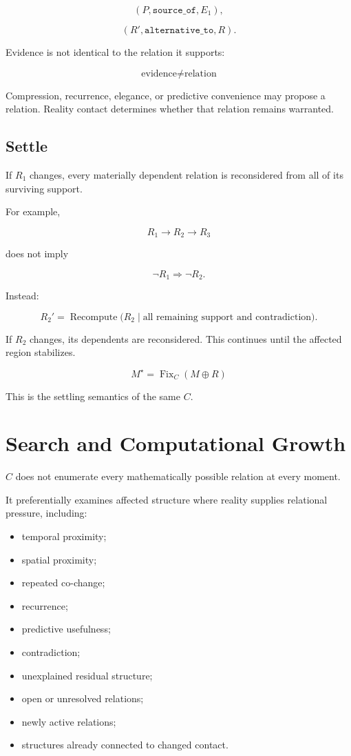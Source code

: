 \documentclass[11pt]{article}
\begin{document}
\[
(P,\texttt{source\_of},E_1),
\]

\[
(R',\texttt{alternative\_to},R).
\]

Evidence is not identical to the relation it supports:

\[
\boxed{\text{evidence}\neq\text{relation}}
\]

Compression, recurrence, elegance, or predictive convenience may propose a relation.
Reality contact determines whether that relation remains warranted.

\subsection{Settle}

If $R_1$ changes, every materially dependent relation is reconsidered from all of its surviving support.

For example,

\[
R_1\rightarrow R_2\rightarrow R_3
\]

does not imply

\[
\neg R_1\Rightarrow \neg R_2.
\]

Instead:

\[
R_2'=
\operatorname{Recompute}
\bigl(
R_2\mid
\text{all remaining support and contradiction}
\bigr).
\]

If $R_2$ changes, its dependents are reconsidered.
This continues until the affected region stabilizes.

\[
\boxed{
M^\star=\operatorname{Fix}_C(M\oplus R)
}
\]

This is the settling semantics of the same $C$.

\section{Search and Computational Growth}

$C$ does not enumerate every mathematically possible relation at every moment.

It preferentially examines affected structure where reality supplies relational pressure, including:

\begin{itemize}[leftmargin=2em]
    \item temporal proximity;
    \item spatial proximity;
    \item repeated co-change;
    \item recurrence;
    \item predictive usefulness;
    \item contradiction;
    \item unexplained residual structure;
    \item open or unresolved relations;
    \item newly active relations;
    \item structures already connected to changed contact.
\end{itemize}
\end{document}
